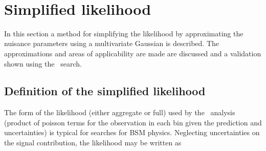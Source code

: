 \begin{figure}[!tbhp]
\begin{center}
     ~~
     \\
  \end{center}
\end{figure}

\section{Simplified likelihood}

In this section a method for simplifying the likelihood by approximating the nuisance parameters
using a multivariate Gaussian is described. The approximations and areas of applicability 
are made are discussed and a validation shown using the \alphat~search.

\subsection{Definition of the simplified likelihood}

The form of the likelihood (either aggregate or full) used by the \alphat~analysis (product of poisson terms 
for the observation in each bin given the prediction and uncertainties)
is typical for searches for BSM physics. Neglecting uncertainties on the signal contribution,
the likelihood may be written as 

